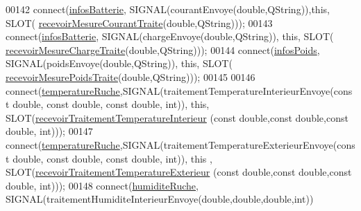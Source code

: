 \begin{DoxyCode}
00142     connect(\hyperlink{class_ruche_af34340e456aff54c8d1ec433fdbe0740}{infosBatterie}, SIGNAL(courantEnvoye(\textcolor{keywordtype}{double},QString)),\textcolor{keyword}{this}, SLOT(
      \hyperlink{class_ruche_a9e416457e8712d353580b7b242ef0836}{recevoirMesureCourantTraite}(\textcolor{keywordtype}{double},QString)));
00143     connect(\hyperlink{class_ruche_af34340e456aff54c8d1ec433fdbe0740}{infosBatterie}, SIGNAL(chargeEnvoye(\textcolor{keywordtype}{double},QString)), \textcolor{keyword}{this}, SLOT(
      \hyperlink{class_ruche_a4ad540139115b79cd52336ad1a11453c}{recevoirMesureChargeTraite}(\textcolor{keywordtype}{double},QString)));
00144     connect(\hyperlink{class_ruche_af3d02b62dd3d986b73b38851bb88ec77}{infosPoids}, SIGNAL(poidsEnvoye(\textcolor{keywordtype}{double},QString)), \textcolor{keyword}{this}, SLOT(
      \hyperlink{class_ruche_afd8b0d7512f325327704cd3e37091dc2}{recevoirMesurePoidsTraite}(\textcolor{keywordtype}{double},QString)));
00145 
00146     connect(\hyperlink{class_ruche_af721fb92f801a9b1f3ef3aa9867cf3de}{temperatureRuche},SIGNAL(traitementTemperatureInterieurEnvoye(\textcolor{keyword}{const} \textcolor{keywordtype}{double}, \textcolor{keyword}{
      const} \textcolor{keywordtype}{double}, \textcolor{keyword}{const} \textcolor{keywordtype}{double}, \textcolor{keywordtype}{int})), \textcolor{keyword}{this}, SLOT(\hyperlink{class_ruche_a2d2a681916140b977d45423d0d5d7b34}{recevoirTraitementTemperatureInterieur}
      (\textcolor{keyword}{const} \textcolor{keywordtype}{double},\textcolor{keyword}{const} \textcolor{keywordtype}{double},\textcolor{keyword}{const} \textcolor{keywordtype}{double}, \textcolor{keywordtype}{int})));
00147     connect(\hyperlink{class_ruche_af721fb92f801a9b1f3ef3aa9867cf3de}{temperatureRuche},SIGNAL(traitementTemperatureExterieurEnvoye(\textcolor{keyword}{const} \textcolor{keywordtype}{double}, \textcolor{keyword}{
      const} \textcolor{keywordtype}{double}, \textcolor{keyword}{const} \textcolor{keywordtype}{double}, \textcolor{keywordtype}{int})), \textcolor{keyword}{this} , SLOT(\hyperlink{class_ruche_a8482dda95a8a7888d5a60ea6f7d8729e}{recevoirTraitementTemperatureExterieur}
      (\textcolor{keyword}{const} \textcolor{keywordtype}{double},\textcolor{keyword}{const} \textcolor{keywordtype}{double},\textcolor{keyword}{const} \textcolor{keywordtype}{double}, \textcolor{keywordtype}{int})));
00148     connect(\hyperlink{class_ruche_acb380928928e693a1933c4cf607ddf80}{humiditeRuche}, SIGNAL(traitementHumiditeInterieurEnvoye(\textcolor{keywordtype}{double},\textcolor{keywordtype}{double},\textcolor{keywordtype}{double},\textcolor{keywordtype}{int}))

\end{DoxyCode}
